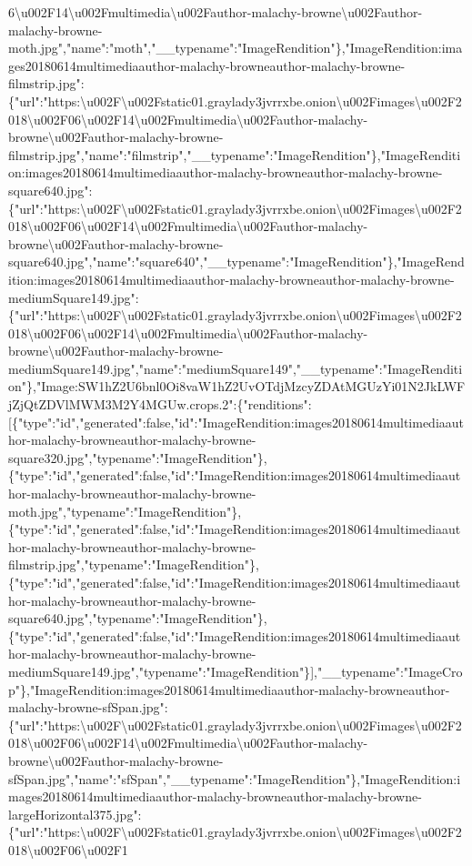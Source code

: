 6\textbackslash{}u002F14\textbackslash{}u002Fmultimedia\textbackslash{}u002Fauthor-malachy-browne\textbackslash{}u002Fauthor-malachy-browne-moth.jpg","name":"moth","\_\_typename":"ImageRendition"\},"ImageRendition:images20180614multimediaauthor-malachy-browneauthor-malachy-browne-filmstrip.jpg":\{"url":"https:\textbackslash{}u002F\textbackslash{}u002Fstatic01.graylady3jvrrxbe.onion\textbackslash{}u002Fimages\textbackslash{}u002F2018\textbackslash{}u002F06\textbackslash{}u002F14\textbackslash{}u002Fmultimedia\textbackslash{}u002Fauthor-malachy-browne\textbackslash{}u002Fauthor-malachy-browne-filmstrip.jpg","name":"filmstrip","\_\_typename":"ImageRendition"\},"ImageRendition:images20180614multimediaauthor-malachy-browneauthor-malachy-browne-square640.jpg":\{"url":"https:\textbackslash{}u002F\textbackslash{}u002Fstatic01.graylady3jvrrxbe.onion\textbackslash{}u002Fimages\textbackslash{}u002F2018\textbackslash{}u002F06\textbackslash{}u002F14\textbackslash{}u002Fmultimedia\textbackslash{}u002Fauthor-malachy-browne\textbackslash{}u002Fauthor-malachy-browne-square640.jpg","name":"square640","\_\_typename":"ImageRendition"\},"ImageRendition:images20180614multimediaauthor-malachy-browneauthor-malachy-browne-mediumSquare149.jpg":\{"url":"https:\textbackslash{}u002F\textbackslash{}u002Fstatic01.graylady3jvrrxbe.onion\textbackslash{}u002Fimages\textbackslash{}u002F2018\textbackslash{}u002F06\textbackslash{}u002F14\textbackslash{}u002Fmultimedia\textbackslash{}u002Fauthor-malachy-browne\textbackslash{}u002Fauthor-malachy-browne-mediumSquare149.jpg","name":"mediumSquare149","\_\_typename":"ImageRendition"\},"Image:SW1hZ2U6bnl0Oi8vaW1hZ2UvOTdjMzcyZDAtMGUzYi01N2JkLWFjZjQtZDVlMWM3M2Y4MGUw.crops.2":\{"renditions":{[}\{"type":"id","generated":false,"id":"ImageRendition:images20180614multimediaauthor-malachy-browneauthor-malachy-browne-square320.jpg","typename":"ImageRendition"\},\{"type":"id","generated":false,"id":"ImageRendition:images20180614multimediaauthor-malachy-browneauthor-malachy-browne-moth.jpg","typename":"ImageRendition"\},\{"type":"id","generated":false,"id":"ImageRendition:images20180614multimediaauthor-malachy-browneauthor-malachy-browne-filmstrip.jpg","typename":"ImageRendition"\},\{"type":"id","generated":false,"id":"ImageRendition:images20180614multimediaauthor-malachy-browneauthor-malachy-browne-square640.jpg","typename":"ImageRendition"\},\{"type":"id","generated":false,"id":"ImageRendition:images20180614multimediaauthor-malachy-browneauthor-malachy-browne-mediumSquare149.jpg","typename":"ImageRendition"\}{]},"\_\_typename":"ImageCrop"\},"ImageRendition:images20180614multimediaauthor-malachy-browneauthor-malachy-browne-sfSpan.jpg":\{"url":"https:\textbackslash{}u002F\textbackslash{}u002Fstatic01.graylady3jvrrxbe.onion\textbackslash{}u002Fimages\textbackslash{}u002F2018\textbackslash{}u002F06\textbackslash{}u002F14\textbackslash{}u002Fmultimedia\textbackslash{}u002Fauthor-malachy-browne\textbackslash{}u002Fauthor-malachy-browne-sfSpan.jpg","name":"sfSpan","\_\_typename":"ImageRendition"\},"ImageRendition:images20180614multimediaauthor-malachy-browneauthor-malachy-browne-largeHorizontal375.jpg":\{"url":"https:\textbackslash{}u002F\textbackslash{}u002Fstatic01.graylady3jvrrxbe.onion\textbackslash{}u002Fimages\textbackslash{}u002F2018\textbackslash{}u002F06\textbackslash{}u002F1
